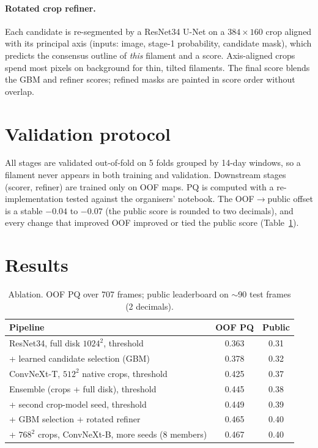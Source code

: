 \paragraph{Rotated crop refiner.} Each candidate is re-segmented by a ResNet34 U-Net on a
$384\times160$ crop aligned with its principal axis (inputs: image, stage-1 probability, candidate mask),
which predicts the consensus outline of \emph{this} filament and a score. Axis-aligned crops spend most
pixels on background for thin, tilted filaments. The final score blends the GBM and refiner scores;
refined masks are painted in score order without overlap.

\section{Validation protocol}
All stages are validated out-of-fold on 5 folds grouped by 14-day windows, so a filament never appears in
both training and validation. Downstream stages (scorer, refiner) are trained only on OOF maps. PQ is
computed with a re-implementation tested against the organisers' notebook. The OOF$\rightarrow$public offset
is a stable $-0.04$ to $-0.07$ (the public score is rounded to two decimals), and every change that improved OOF improved or tied the public score
(Table~\ref{tab:ablation}).

\section{Results}
\begin{table}[t]
\caption{Ablation. OOF PQ over 707 frames; public leaderboard on $\sim$90 test frames (2 decimals).}
\label{tab:ablation}
\small
\begin{tabular}{lcc}
\toprule
Pipeline & OOF PQ & Public \\
\midrule
ResNet34, full disk $1024^2$, threshold & 0.363 & 0.31 \\
+ learned candidate selection (GBM) & 0.378 & 0.32 \\
ConvNeXt-T, $512^2$ native crops, threshold & 0.425 & 0.37 \\
Ensemble (crops + full disk), threshold & 0.445 & 0.38 \\
+ second crop-model seed, threshold & 0.449 & 0.39 \\
+ GBM selection + rotated refiner & 0.465 & 0.40 \\
+ $768^2$ crops, ConvNeXt-B, more seeds (8 members) & 0.467 & 0.40 \\
\bottomrule
\end{tabular}
\end{table}

